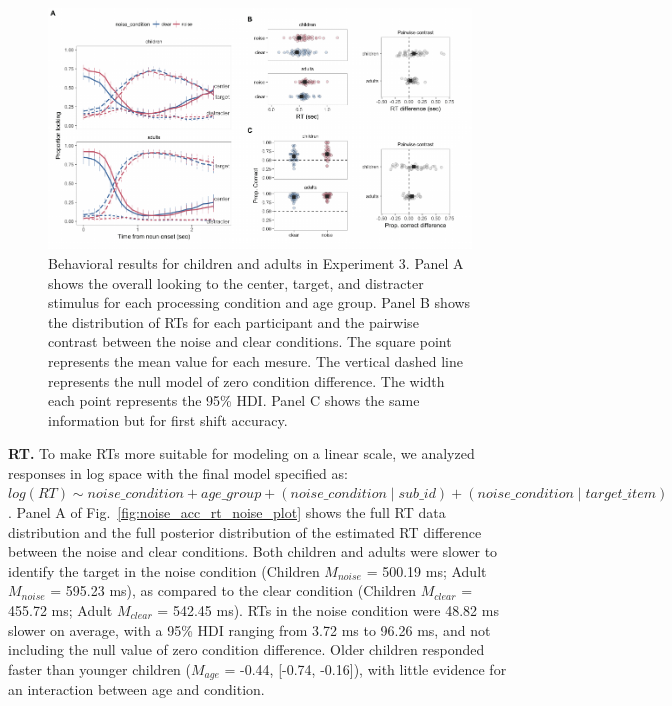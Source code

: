 \documentclass[english,floatsintext,man]{apa6}
\theoremstyle{definition}
\theoremstyle{definition}
\theoremstyle{definition}
\theoremstyle{remark}
\begin{document}
\begin{figure}[tb]

{\centering \includegraphics[width=0.8\linewidth]{figs/noise-acc-rt-1} 

}

\caption{Behavioral results for children and adults in Experiment 3. Panel A shows the overall looking to the center, target, and distracter stimulus for each processing condition and age group. Panel B shows the distribution of RTs for each participant and the pairwise contrast between the noise and clear conditions. The square point represents the mean value for each mesure. The vertical dashed line represents the null model of zero condition difference. The width each point represents the 95\% HDI. Panel C shows the same information but for first shift accuracy.}\label{fig:noise-acc-rt}
\end{figure}

\textbf{RT.} To make RTs more suitable for modeling on a linear scale,
we analyzed responses in log space with the final model specified as:
\texttt{$log(RT) \sim noise\_condition + age\_group + (noise\_condition \mid sub\_id ) + (noise\_condition \mid target\_item)$}.
Panel A of Fig.~\ref{fig:noise_acc_rt_noise_plot} shows the full RT data
distribution and the full posterior distribution of the estimated RT
difference between the noise and clear conditions. Both children and
adults were slower to identify the target in the noise condition
(Children \(M_{noise}\) = 500.19 ms; Adult \(M_{noise}\) = 595.23 ms),
as compared to the clear condition (Children \(M_{clear}\) = 455.72 ms;
Adult \(M_{clear}\) = 542.45 ms). RTs in the noise condition were 48.82
ms slower on average, with a 95\% HDI ranging from 3.72 ms to 96.26 ms,
and not including the null value of zero condition difference. Older
children responded faster than younger children (\(M_{age}\) = -0.44,
{[}-0.74, -0.16{]}), with little evidence for an interaction between age
and condition.
\end{document}

